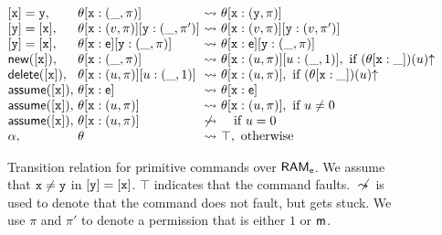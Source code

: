 \begin{figure}[t]
{\small
$$
\begin{array}{@{}l@{\ }l@{\ }l@{\ }l@{\ }l@{}}
[{\tt x}] = {\tt y}, &\theta[{\tt x} : (\_,\pi)] &\leadsto& \theta[{\tt x}: ({\tt y},\pi)]
\\{}
[{\tt y}] = [{\tt x}], &\theta[{\tt x} : (v,\pi)][{\tt y} : (\_,\pi')] &\leadsto&
\theta[{\tt x}:(v,\pi)][{\tt y}:(v,\pi')]
\\{}
[{\tt y}] = [{\tt x}], &\theta[{\tt x} : \se][{\tt y} : (\_,\pi)] &\leadsto&
\theta[{\tt x}:\se][{\tt y}: (\_,\pi)]
\\{}
\new([{\tt x}]), &\theta[{\tt x} : (\_,\pi)] &\leadsto&
\theta[{\tt x}: (u,\pi)][u : (\_,1)],
\ \text{if}~{(\theta[{\tt x} : \_])(u)\fundef}
\\
\delete([{\tt x}]),&\theta[{\tt x} : (u,\pi)][u : (\_,1)] &\leadsto&
\theta[{\tt x}:(u,\pi)],
\ \text{if}~{(\theta[{\tt x} : \_])(u)\fundef}
\\
{\sf assume}([{\tt x}]), &\theta[{\tt x} : \se] &\leadsto& \theta[{\tt x} : \se]
\\
{\sf assume}([{\tt x}]), &\theta[{\tt x} : (u,\pi)] &\leadsto& \theta[{\tt x} : (u,\pi)],
\ \text{if}~u\not=0
\\
{\sf assume}([{\tt x}]), &\theta[{\tt x} :  (u,\pi)] &\not\leadsto&   \quad \text{if}~u=0
\\
\alpha, &\theta &\leadsto& \top,\ \text{otherwise}
\end{array}
$$
}
\caption{\label{fig:transfer}\small 
Transition relation for primitive commands over ${\sf RAM}_{{\sf e}}$. We assume that
${\tt x}\not={\tt y}$ in $[{\tt y}]=[{\tt x}]$.
$\top$ indicates that the command faults.
$\not\leadsto$ is used to denote that the command does not fault, but gets stuck.
We use $\pi$ and $\pi'$ to denote  a permission that is either 
$1$ or ${\sf m}$.
}
\end{figure}

